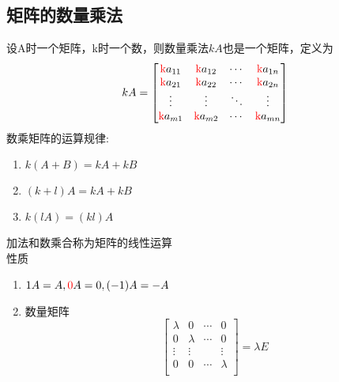 \subsection{矩阵的数量乘法}
设A时一个矩阵，k时一个数，则数量乘法$kA$也是一个矩阵，定义为
$$kA=
\left[ \begin{matrix}
    \text{{\color{red}k}}{{a}_{11}} & \text{{\color{red}k}}{{a}_{12}} & \cdots  & \text{{\color{red}k}}{{a}_{1n}}  \\
    \text{{\color{red}k}}{{a}_{21}} & \text{{\color{red}k}}{{a}_{22}} & \cdots  & \text{{\color{red}k}}{{a}_{2n}}  \\
    \vdots  & \vdots  & {\ddots} & \vdots   \\
    \text{{\color{red}k}}{{a}_{m1}} & \text{{\color{red}k}}{{a}_{m2}} & \cdots  & \text{{\color{red}k}}{{a}_{mn}}  \\   
\end{matrix} \right]
$$
数乘矩阵的运算规律:\\
\begin{enumerate}
    \item{
        $k(A+B)=kA+kB$
    }
    \item{
        $(k+l)A=kA+kB$
    }
    \item{
        $k(lA)=(kl)A$
    }
\end{enumerate}
加法和数乘合称为矩阵的{\color{blue}线性运算}\\
{\color{blue}性质}
\begin{enumerate}
    \item{
        $1A=A,{\color{red}0}A=0,(-1)A=-A$
    }
    \item{
        数量矩阵
        $$
        \left[ \begin{matrix}
            \lambda  & 0 & \cdots  & 0  \\
            0 & \lambda  & \cdots  & 0  \\
            \vdots  & \vdots  & {} & \vdots   \\
            0 & 0 & \cdots  & \lambda   \\         
        \end{matrix} \right]=\lambda E
        $$
    }
\end{enumerate}
